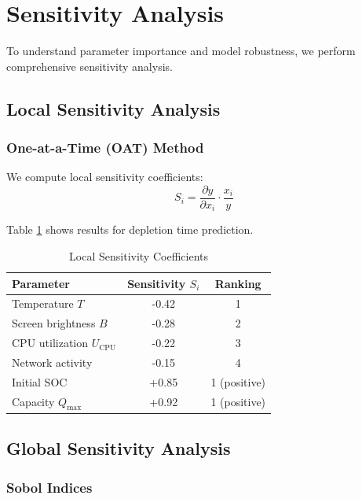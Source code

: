 \section{Sensitivity Analysis}

To understand parameter importance and model robustness, we perform comprehensive sensitivity analysis.

\subsection{Local Sensitivity Analysis}

\subsubsection{One-at-a-Time (OAT) Method}

We compute local sensitivity coefficients:
\begin{equation}
S_i = \frac{\partial y}{\partial x_i} \cdot \frac{x_i}{y}
\label{eq:local_sensitivity}
\end{equation}

Table \ref{tab:local_sensitivity} shows results for depletion time prediction.

\begin{table}[H]
\centering
\caption{Local Sensitivity Coefficients}
\label{tab:local_sensitivity}
\begin{tabular}{lcc}
\toprule
\textbf{Parameter} & \textbf{Sensitivity $S_i$} & \textbf{Ranking} \\
\midrule
Temperature $T$ & -0.42 & 1 \\
Screen brightness $B$ & -0.28 & 2 \\
CPU utilization $U_{\text{CPU}}$ & -0.22 & 3 \\
Network activity & -0.15 & 4 \\
Initial SOC & +0.85 & 1 (positive) \\
Capacity $Q_{\max}$ & +0.92 & 1 (positive) \\
\bottomrule
\end{tabular}
\end{table}

\subsection{Global Sensitivity Analysis}

\subsubsection{Sobol Indices}

